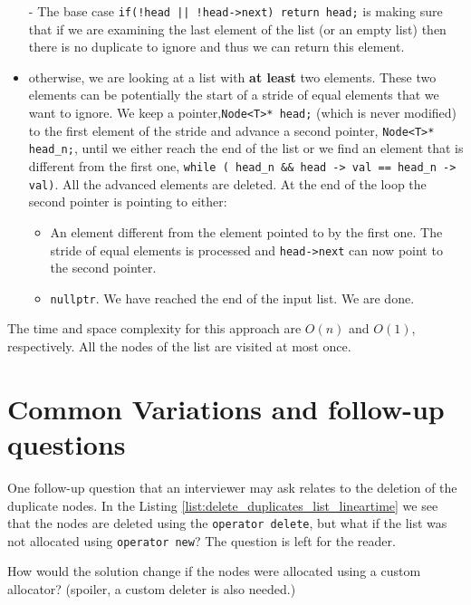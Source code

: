 \begin{itemize}
	\item[-] The base case \lstinline[columns=fixed]{if(!head || !head->next) return head;} is making sure that if we are examining the last element of the list (or an empty list) then there is no duplicate to ignore and thus we can return this element.
	\item[-] otherwise, we are looking at a list with \textbf{at least} two elements. These two elements can be potentially the start of a stride of equal elements that we want to ignore. We keep a pointer,\lstinline[columns=fixed]{Node<T>* head;} (which is never modified) to the first element  of the stride and advance a second pointer, \lstinline[columns=fixed]{Node<T>* head_n;}, until we either reach the end of the list or we find an element that is different from the first one, \lstinline[columns=fixed]{while ( head_n && head -> val == head_n -> val)}. All the advanced elements are deleted. At the end of the loop the second pointer  is pointing to either:
	\begin{itemize}
		\item[-] An element different from the element pointed to  by the first one. The stride of equal elements is processed and  \lstinline[columns=fixed]{head->next} can now point to the second pointer.
		\item[-] \lstinline[columns=fixed]{nullptr}. We have reached the end of the input list. We are done.
	\end{itemize}
\end{itemize}


The time and space complexity for this approach are $O(n)$ and $O(1)$, respectively. All the nodes of the list are  visited at most once.




\section{Common Variations and follow-up questions}
One follow-up question that an interviewer may ask relates to the deletion of the duplicate nodes. In the Listing \ref{list:delete_duplicates_list_lineartime} we see that the nodes are deleted using the \lstinline[columns=fixed]{operator delete}, but what if the list was not allocated using \lstinline[columns=fixed]{operator new}? The question is left for the reader.

\begin{exercise}
How would the solution change if the nodes were allocated using a custom allocator? (spoiler, a custom deleter is also needed.)
\end{exercise}